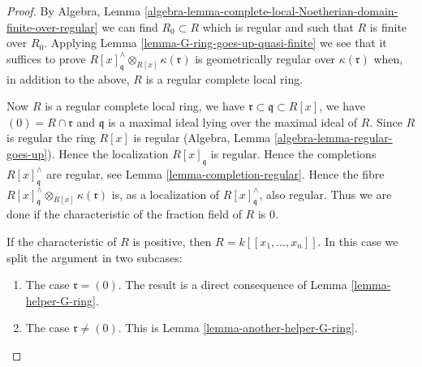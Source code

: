 \begin{proof}
\medskip\noindent
By  Algebra, Lemma
\ref{algebra-lemma-complete-local-Noetherian-domain-finite-over-regular}
we can find $R_0 \subset R$ which is regular and such that $R$ is
finite over $R_0$. Applying Lemma \ref{lemma-G-ring-goes-up-quasi-finite}
we see that it suffices to prove
$R[x]_\mathfrak q^\wedge \otimes_{R[x]} \kappa(\mathfrak r)$
is geometrically regular over $\kappa(\mathfrak r)$ when, in addition to the
above, $R$ is a regular complete local ring.

\medskip\noindent
Now $R$ is a regular complete local ring, we have
$\mathfrak r \subset \mathfrak q \subset R[x]$, we have
$(0) = R \cap \mathfrak r$ and $\mathfrak q$ is a maximal ideal
lying over the maximal ideal of $R$. Since $R$ is regular the
ring $R[x]$ is regular (Algebra, Lemma \ref{algebra-lemma-regular-goes-up}).
Hence the localization $R[x]_\mathfrak q$ is regular.
Hence the completions $R[x]_\mathfrak q^\wedge$ are regular, see
Lemma \ref{lemma-completion-regular}.
Hence the fibre $R[x]_{\mathfrak q}^\wedge \otimes_{R[x]} \kappa(\mathfrak r)$
is, as a localization of $R[x]_\mathfrak q^\wedge$, also regular.
Thus we are done if the characteristic of the fraction field of $R$ is $0$.

\medskip\noindent
If the characteristic of $R$ is positive, then $R = k[[x_1, \ldots, x_n]]$.
In this case we split the argument in two subcases:
\begin{enumerate}
\item The case $\mathfrak r = (0)$. The result is a direct consequence
of Lemma \ref{lemma-helper-G-ring}.
\item The case $\mathfrak r \not = (0)$. This is
Lemma \ref{lemma-another-helper-G-ring}.
\end{enumerate}
\end{proof}